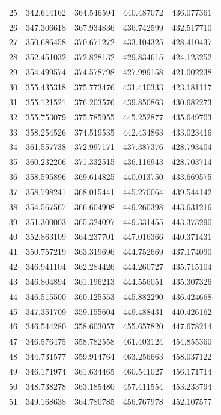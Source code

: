 \begin{table}
\begin{tabular}{rrrrr}
25 & 342.614162 & 364.546594 & 440.487072 & 436.077361 \\
26 & 347.306618 & 367.934836 & 436.742599 & 432.517710 \\
27 & 350.686458 & 370.671272 & 433.104325 & 428.410437 \\
28 & 352.451032 & 372.828132 & 429.834615 & 424.123252 \\
29 & 354.499574 & 374.578798 & 427.999158 & 421.002238 \\
30 & 355.435318 & 375.773476 & 431.410333 & 423.181117 \\
31 & 355.121521 & 376.203576 & 439.850863 & 430.682273 \\
32 & 355.753079 & 375.785955 & 445.252877 & 435.649703 \\
33 & 358.254526 & 374.519535 & 442.434863 & 433.023416 \\
34 & 361.557738 & 372.997171 & 437.387376 & 428.793404 \\
35 & 360.232206 & 371.332515 & 436.116943 & 428.703714 \\
36 & 358.595896 & 369.614825 & 440.013750 & 433.669575 \\
37 & 358.798241 & 368.015441 & 445.270064 & 439.544142 \\
38 & 354.567567 & 366.604908 & 449.260398 & 443.631216 \\
39 & 351.300003 & 365.324097 & 449.331455 & 443.373290 \\
40 & 352.863109 & 364.237701 & 447.016366 & 440.371431 \\
41 & 350.757219 & 363.319696 & 444.752669 & 437.174090 \\
42 & 346.941104 & 362.284426 & 444.260727 & 435.715104 \\
43 & 346.804894 & 361.196213 & 444.556051 & 435.307326 \\
44 & 346.515500 & 360.125553 & 445.882290 & 436.424668 \\
45 & 347.351709 & 359.155604 & 449.488431 & 440.426162 \\
46 & 346.544280 & 358.603057 & 455.657820 & 447.678214 \\
47 & 346.576475 & 358.782558 & 461.403124 & 454.855360 \\
48 & 344.731577 & 359.914764 & 463.256663 & 458.037122 \\
49 & 346.171974 & 361.634465 & 460.541027 & 456.171714 \\
50 & 348.738278 & 363.185480 & 457.411554 & 453.233794 \\
51 & 349.168638 & 364.780785 & 456.767978 & 452.107577 \\

\end{tabular}
\end{table}
